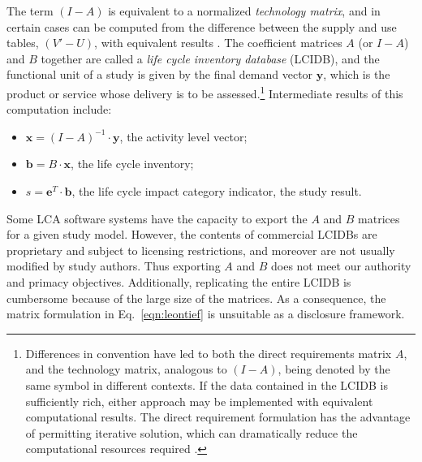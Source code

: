 The term $(I-A)$ is equivalent to a normalized \textit{technology matrix}, and in certain cases can be computed from the difference between the supply and use tables, $(V'-U)$, with equivalent results \citep{Suh_JIE_2010}. 
The coefficient matrices $A$ (or $I-A$) and $B$ together are called a \textit{life cycle inventory database} (LCIDB), and the functional unit of a study is given by the final demand vector $\mathbf{y}$, which is the product or service whose delivery is to be assessed.\footnote{%
Differences in convention have led to both the direct requirements matrix $A$, and the technology matrix, analogous to $(I-A)$, being denoted by the same symbol in different contexts.  If the data contained in the LCIDB is sufficiently rich, either approach may be implemented with equivalent computational results.  The direct requirement formulation has the advantage of permitting iterative solution, which can dramatically reduce the computational resources required \citep{Peters_JLCA_2007}.}  Intermediate results of this computation include:
\begin{itemize}
\item $\mathbf{x} = \left(I-A\right)^{-1}\cdot\mathbf{y}$, the activity level vector;
\item $\mathbf{b} = B\cdot\mathbf{x}$, the life cycle inventory;
\item $s = \mathbf{e}^T\cdot\mathbf{b}$, the life cycle impact category indicator, the study result.
\end{itemize}

Some LCA software systems have the capacity to export the $A$ and $B$ matrices for a given study model.  However, the contents of commercial LCIDBs are proprietary and subject to licensing restrictions, and moreover are not usually modified by study authors.  Thus exporting $A$ and $B$ does not meet our authority and primacy objectives.  Additionally, replicating the entire LCIDB is cumbersome because of the large size of the matrices.   As a consequence, the matrix formulation in Eq.~\ref{eqn:leontief} is unsuitable as a disclosure framework.
